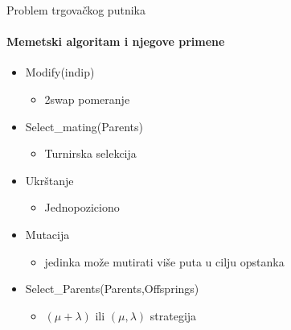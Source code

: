 \documentclass{beamer}
\begin{document}
\begin{frame}[fragile]{Problem trgovačkog putnika}
  \framesubtitle{Memetski algoritam i njegove primene}

    \begin{itemize}
     \item{Modify(indip)}
       \begin{itemize}
     \item{2swap pomeranje}
     \end{itemize}
   
  
    \item{Select\_mating(Parents)}
     \begin{itemize}
     \item{Turnirska selekcija}
     \end{itemize}
       \item{Ukrštanje}
       \begin{itemize}
     \item{Jednopoziciono}
     \end{itemize}
     
     \item{Mutacija}
      \begin{itemize}
     \item{jedinka može mutirati više puta u cilju opstanka}
     \end{itemize}
   \item{Select\_Parents(Parents,Offsprings)}
      \begin{itemize}
     \item{$(\mu + \lambda)$ ili $(\mu,\lambda)$ strategija}
     \end{itemize}
  \end{itemize}

\end{frame}
\end{document}
